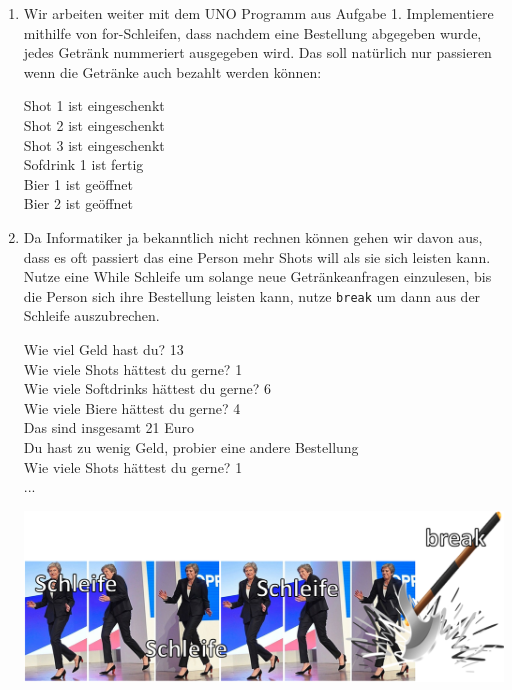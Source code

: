 \documentclass{../../sheet}
\begin{document}
\newpage
{}
\begin{enumerate}
    \item Wir arbeiten weiter mit dem UNO Programm aus Aufgabe 1. Implementiere mithilfe von for-Schleifen, dass nachdem eine Bestellung abgegeben wurde, jedes Getränk nummeriert ausgegeben wird. Das soll natürlich nur passieren wenn die Getränke auch bezahlt werden können:
          \begin{ausgabe}
              Shot 1 ist eingeschenkt\\
              Shot 2 ist eingeschenkt\\
              Shot 3 ist eingeschenkt\\
              Sofdrink 1 ist fertig\\
              Bier 1 ist geöffnet\\
              Bier 2 ist geöffnet
          \end{ausgabe}
    \item Da Informatiker ja bekanntlich nicht rechnen können gehen wir davon aus, dass es oft passiert das eine Person mehr Shots will als sie sich leisten kann. Nutze eine While Schleife um solange neue Getränkeanfragen einzulesen, bis die Person sich ihre Bestellung leisten kann, nutze \texttt{break} um dann aus der Schleife auszubrechen.
          \begin{ausgabe}
              Wie viel Geld hast du? 13\\
              Wie viele Shots hättest du gerne? 1\\
              Wie viele Softdrinks hättest du gerne? 6\\
              Wie viele Biere hättest du gerne? 4\\
              Das sind insgesamt 21 Euro\\
              Du hast zu wenig Geld, probier eine andere Bestellung\\
              Wie viele Shots hättest du gerne? 1\\
              ...
          \end{ausgabe}

          \includegraphics[width=1\linewidth]{../../memes/breakohnerand.png}
\end{enumerate}
\newpage
\end{document}
